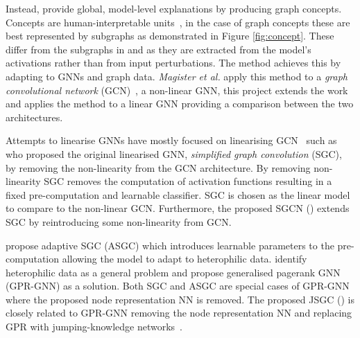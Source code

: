 Instead, \citet{magister2021gcexplainer} provide global, model-level explanations by producing graph concepts.
Concepts are human-interpretable units~\cite{ghorbani2019towards}, in the case of graph concepts these are best represented by subgraphs as demonstrated in Figure \ref{fig:concept}.
These differ from the subgraphs in \citet{ying2019gnnexplainer} and \citet{luo2020parameterized} as they are extracted from the model's activations rather than from input perturbations.
The method achieves this by adapting \citet{ghorbani2019towards} to GNNs and graph data.
\textit{Magister et al.} apply this method to a \emph{graph convolutional network} (GCN)~\cite{kipf2016semi}, a non-linear GNN, this project extends the work and applies the method to a linear GNN providing a comparison between the two architectures.

Attempts to linearise GNNs have mostly focused on linearising GCN~\cite{kipf2016semi} such as \citet{wu2019simplifying} who proposed the original linearised GNN, \emph{simplified graph convolution} (SGC), by removing the non-linearity from the GCN architecture.
By removing non-linearity SGC removes the computation of activation functions resulting in a fixed pre-computation and learnable classifier.
SGC is chosen as the linear model to compare to the non-linear GCN.
Furthermore, the proposed SGCN () extends SGC by reintroducing some non-linearity from GCN.

\citet{chanpuriya2022simplified} propose adaptive SGC (ASGC) which introduces learnable parameters to the pre-computation allowing the model to adapt to heterophilic data.
\citet{chien2020adaptive} identify heterophilic data as a general problem and propose generalised pagerank GNN (GPR-GNN) as a solution.
Both SGC and ASGC are special cases of GPR-GNN where the proposed node representation NN is removed.
The proposed JSGC () is closely related to GPR-GNN removing the node representation NN and replacing GPR with jumping-knowledge networks~\cite{xu2018representation}.

